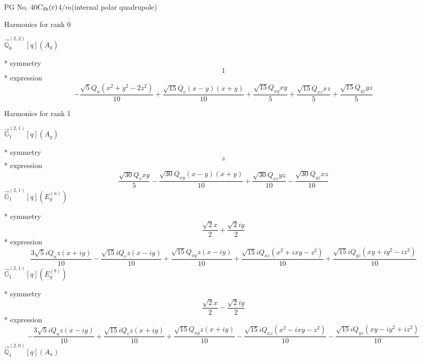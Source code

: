 \documentclass[fleqn,8pt]{jsarticle}
\begin{document}
\setcounter{MaxMatrixCols}{32}

\renewcommand{\tablename}{Table~}
\renewcommand{\figurename}{Figure~}
\begin{center}
\LARGE
PG No. 40\quad$C_{\rm 4h}(c)$\quad$4/m$\quad[ tetragonal ] (internal polar quadrupole)
\end{center}

\noindent * Harmonics for rank 0

\noindent\quad $\vec{\mathbb{Q}}_{0}^{(2,2)}[q](A_{g})$

\noindent\quad ** symmetry
\begin{dmath*}
1
\end{dmath*}
\noindent\quad ** expression
\begin{dmath*}
- \frac{\sqrt{5} Q_{u} \left(x^{2} + y^{2} - 2 z^{2}\right)}{10} + \frac{\sqrt{15} Q_{v} \left(x - y\right) \left(x + y\right)}{10} + \frac{\sqrt{15} Q_{xy} x y}{5} + \frac{\sqrt{15} Q_{xz} x z}{5} + \frac{\sqrt{15} Q_{yz} y z}{5}
\end{dmath*}

\noindent * Harmonics for rank 1

\noindent\quad $\vec{\mathbb{G}}_{1}^{(2,1)}[q](A_{g})$

\noindent\quad ** symmetry
\begin{dmath*}
z
\end{dmath*}
\noindent\quad ** expression
\begin{dmath*}
\frac{\sqrt{30} Q_{v} x y}{5} - \frac{\sqrt{30} Q_{xy} \left(x - y\right) \left(x + y\right)}{10} + \frac{\sqrt{30} Q_{xz} y z}{10} - \frac{\sqrt{30} Q_{yz} x z}{10}
\end{dmath*}
\noindent\quad $\vec{\mathbb{G}}_{1}^{(2,1)}[q](E_{g}^{(a)})$

\noindent\quad ** symmetry
\begin{dmath*}
\frac{\sqrt{2} x}{2} + \frac{\sqrt{2} i y}{2}
\end{dmath*}
\noindent\quad ** expression
\begin{dmath*}
\frac{3 \sqrt{5} i Q_{u} z \left(x + i y\right)}{10} - \frac{\sqrt{15} i Q_{v} z \left(x - i y\right)}{10} + \frac{\sqrt{15} Q_{xy} z \left(x - i y\right)}{10} + \frac{\sqrt{15} i Q_{xz} \left(x^{2} + i x y - z^{2}\right)}{10} + \frac{\sqrt{15} i Q_{yz} \left(x y + i y^{2} - i z^{2}\right)}{10}
\end{dmath*}
\noindent\quad $\vec{\mathbb{G}}_{1}^{(2,1)}[q](E_{g}^{(b)})$

\noindent\quad ** symmetry
\begin{dmath*}
\frac{\sqrt{2} x}{2} - \frac{\sqrt{2} i y}{2}
\end{dmath*}
\noindent\quad ** expression
\begin{dmath*}
- \frac{3 \sqrt{5} i Q_{u} z \left(x - i y\right)}{10} + \frac{\sqrt{15} i Q_{v} z \left(x + i y\right)}{10} + \frac{\sqrt{15} Q_{xy} z \left(x + i y\right)}{10} - \frac{\sqrt{15} i Q_{xz} \left(x^{2} - i x y - z^{2}\right)}{10} - \frac{\sqrt{15} i Q_{yz} \left(x y - i y^{2} + i z^{2}\right)}{10}
\end{dmath*}
\noindent\quad $\vec{\mathbb{Q}}_{1}^{(2,0)}[q](A_{u})$
\end{document}
